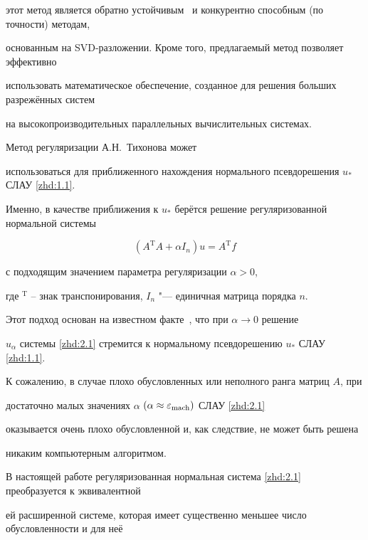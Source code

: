 этот метод является обратно устойчивым~\cite{zhdanov:Tref} и конкурентно способным (по точности) методам,

основанным на SVD-разложении. Кроме того, предлагаемый метод позволяет эффективно

использовать математическое обеспечение, созданное для решения больших разрежённых систем

на высокопроизводительных параллельных вычислительных системах.






Метод регуляризации А.Н.~Тихонова может

использоваться для приближенного нахождения нормального псевдорешения $u_*$ СЛАУ \eqref{zhd:1.1}.

Именно, в качестве приближения к $u_*$ берётся решение регуляризованной нормальной системы

\begin{equation}\label{zhd:2.1}

    (A^\mathrm{T}A+\alpha I_n)u=A^\mathrm{T}f

\end{equation}

с подходящим значением параметра регуляризации $\alpha>0$,

где $^\mathrm{T}$ -- знак транспонирования, $I_n$ "--- единичная матрица порядка $n$.

Этот подход основан на известном факте~\cite{zhdanov:Bekl}, что при $\alpha\rightarrow0$ решение

$u_\alpha$ системы \eqref{zhd:2.1} стремится к нормальному псевдорешению $u_*$ СЛАУ \eqref{zhd:1.1}.

К сожалению, в случае плохо обусловленных или неполного ранга матриц $A$, при

достаточно малых значениях $\alpha$ $(\alpha\approx\varepsilon_{\rm mach})$ СЛАУ \eqref{zhd:2.1}

оказывается очень плохо обусловленной и, как следствие, не может быть решена

никаким компьютерным алгоритмом.



В настоящей работе регуляризованная нормальная система \eqref{zhd:2.1} преобразуется к эквивалентной

ей расширенной системе, которая имеет существенно меньшее число обусловленности и для неё

